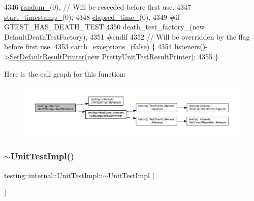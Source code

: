 \begin{DoxyCode}
4346       \hyperlink{classtesting_1_1internal_1_1UnitTestImpl_a08551d7ff0ebb976ec82294ded8113ea}{random\_}(0),  \textcolor{comment}{// Will be reseeded before first use.}
4347       \hyperlink{classtesting_1_1internal_1_1UnitTestImpl_a2114799ed634ee849b9dcd9728f9b7b6}{start\_timestamp\_}(0),
4348       \hyperlink{classtesting_1_1internal_1_1UnitTestImpl_a06e0445298c6026bee71bb2bb7aae604}{elapsed\_time\_}(0),
4349 \textcolor{preprocessor}{#if GTEST\_HAS\_DEATH\_TEST}
4350       death\_test\_factory\_(\textcolor{keyword}{new} DefaultDeathTestFactory),
4351 \textcolor{preprocessor}{#endif}
4352       \textcolor{comment}{// Will be overridden by the flag before first use.}
4353       \hyperlink{classtesting_1_1internal_1_1UnitTestImpl_a2cc0c6f466730b1d6e884738344b8e33}{catch\_exceptions\_}(\textcolor{keyword}{false}) \{
4354   \hyperlink{classtesting_1_1internal_1_1UnitTestImpl_a67211f8475936f88d0e4d30f841c0da4}{listeners}()->\hyperlink{classtesting_1_1TestEventListeners_aeaab55da7c18c35fb12c27c18ff99955}{SetDefaultResultPrinter}(\textcolor{keyword}{new} PrettyUnitTestResultPrinter);
4355 \}
\end{DoxyCode}
Here is the call graph for this function\+:
\nopagebreak
\begin{figure}[H]
\begin{center}
\leavevmode
\includegraphics[width=350pt]{classtesting_1_1internal_1_1UnitTestImpl_a5fb75faa88ee71f26e16473455b70839_cgraph}
\end{center}
\end{figure}
\mbox{\label{classtesting_1_1internal_1_1UnitTestImpl_ae8bfe40adf9772237ea51299af113575}} 
\subsubsection{\texorpdfstring{$\sim$\+Unit\+Test\+Impl()}{~UnitTestImpl()}}
{\footnotesize\ttfamily testing\+::internal\+::\+Unit\+Test\+Impl\+::$\sim$\+Unit\+Test\+Impl (\begin{DoxyParamCaption}{ }\end{DoxyParamCaption})\hspace{0.3cm}{\ttfamily [virtual]}}



